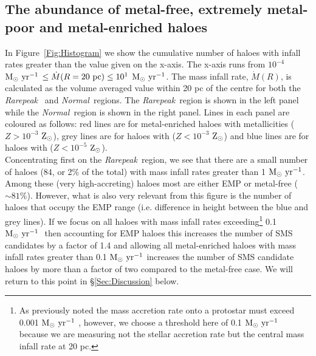 \documentclass[twocolumn,iop,revtex4]{openjournal}
\newcommand{\msolaryr} {$\rm{M_{\odot}~yr^{-1}}~$}
\newcommand{\msolaryrc} {$\rm{M_{\odot}~yr^{-1}}$}
\newcommand{\zsolarc} {$\rm{Z_{\odot}}$}
\newcommand{\rarepeak} {\textit{Rarepeak~}}
\newcommand{\normal} {\textit{Normal~}}
\begin{document}
\subsection{The abundance of metal-free, extremely metal-poor and metal-enriched haloes}
In Figure~\ref{Fig:Histogram} we show the cumulative number of haloes with infall rates greater than
the value given on the x-axis. The x-axis runs from
$10^{-4}$ \msolaryr $\leq \dot{M}(R=20~{\rm pc}) \leq 10^{1}$ \msolaryrc. 
 The mass infall rate,
$\dot{M}(R)$, is calculated as the volume averaged value within 20 pc of the centre for both the \rarepeak 
and \normal regions. The
\rarepeak region is shown in the left panel while the \normal region is shown in the right 
panel. Lines in each panel are coloured as follows: red lines are for metal-enriched haloes with
metallicities ($Z > 10^{-3}$ \zsolarc), grey lines are for haloes with ($Z < 10^{-3}$ \zsolarc) and
blue lines are for haloes with ($Z < 10^{-5}$ \zsolarc).\\
\indent Concentrating first on the \rarepeak region, we see that there are a small number of
haloes ($84$, or 2\% of the total) with mass infall rates greater than 1 \msolaryrc. Among these (very high-accreting)
haloes most are either EMP or metal-free ($\sim 81$\%). However, what is also very relevant from this figure
is the number of haloes that occupy the EMP range (i.e. difference in height between the
blue and grey lines). If we focus on all haloes with mass infall rates
exceeding\footnote{As previously noted the mass accretion rate onto a protostar must exceed
  0.001 \msolaryr \cite{Haemmerle_2018}, however, we choose a threshold here of 0.1 \msolaryr
  because we are measuring not the
  stellar accretion rate but the central mass infall rate at 20 pc.}  0.1
\msolaryr
then accounting for EMP
haloes this increases the number of SMS candidates by a factor of 1.4 and allowing all metal-enriched haloes
with mass infall rates greater than 0.1 \msolaryr increases the number of SMS candidate haloes
by more than a factor of two
compared to the metal-free case. We will return to this point in \S \ref{Sec:Discussion} below. \\
\end{document}
